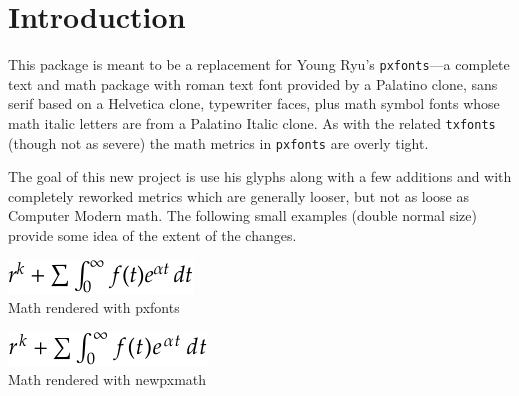 \documentclass[11pt]{article}
\author{Michael Sharpe}
\date{\today}  %
\begin{document}
\maketitle
\section{Introduction}
This package is meant to be  a replacement for Young Ryu's {\tt pxfonts}---a complete text and math package with roman text font provided by a Palatino clone, sans serif based on a \textsf{Helvetica} clone, typewriter faces, plus math symbol fonts whose math italic letters are from a Palatino Italic clone. As with the related {\tt txfonts} (though not as severe) the math metrics in {\tt pxfonts} are overly tight.

The goal of this new project is use his glyphs along with a few additions and with completely reworked metrics which are generally looser, but not as loose as Computer Modern math. The following small examples (double normal size) provide some idea of the  extent of the changes.


\begin{minipage}{3.1in}
\begin{center}
\includegraphics[scale=2]{pxfontseg-crop}\\
Math rendered with pxfonts
\end{center}
\end{minipage}
\begin{minipage}{3.1in}
\begin{center}
\includegraphics[scale=2]{newpxeg-crop}\\
Math rendered with newpxmath
\end{center}

\end{minipage}
\end{document}
